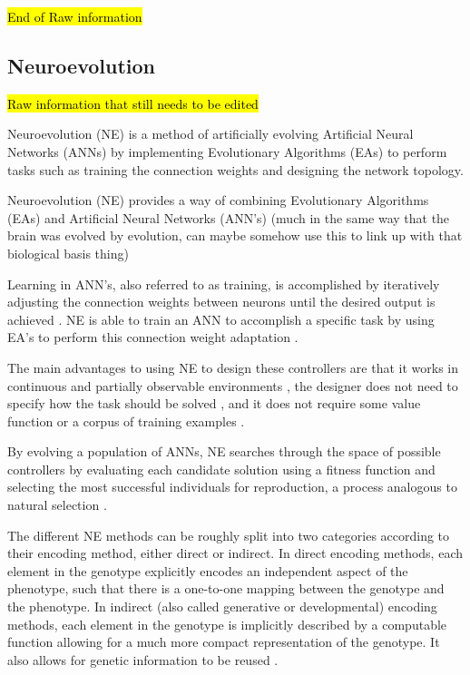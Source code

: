 \documentclass[conference]{IEEEtran}
\begin{document}
\hl{End of Raw information}

\subsection{Neuroevolution}

\hl{Raw information that still needs to be edited}

Neuroevolution (NE) is a method of artificially evolving Artificial Neural Networks (ANNs) by implementing Evolutionary Algorithms (EAs) to perform tasks such as training the connection weights and designing the network topology\cite{RefWorks:31,RefWorks:1}. 

Neuroevolution (NE) provides a way of combining Evolutionary Algorithms (EAs) and Artificial Neural Networks (ANN's)  (much in the same way that the brain was evolved by evolution, can maybe somehow use this to link up with that biological basis thing)

Learning in ANN's, also referred to as training, is accomplished by iteratively adjusting the connection weights between neurons until the desired output is achieved \cite{dayhoff2001artificial}. NE is able to train an ANN to accomplish a specific task by using EA's to perform this connection weight adaptation \cite{Miikkulainen2010}.

The main advantages to using NE to design these controllers are that it works in continuous and partially observable environments \cite{Miikkulainen:2010:ENN:1830761.1830902}, the designer does not need to specify how the task should be solved \cite{RefWorks:32}, and it does not require some value function or a corpus of training examples \cite{GomezSchmidhuberMiikkulainen2006}.

By evolving a population of ANNs, NE searches through the space of possible controllers by evaluating each candidate solution using a fitness function and selecting the most successful individuals for reproduction, a process analogous to natural selection \cite{RefWorks:32,gomez2001neuro}. 

The different NE methods can be roughly split into two categories according to their encoding method, either direct or indirect. In direct encoding methods, each element in the genotype explicitly encodes an independent aspect of the phenotype, such that there is a one-to-one mapping between the genotype and the phenotype. In indirect (also called generative or developmental) encoding methods, each element in the genotype is implicitly described by a computable function allowing for a much more compact representation of the genotype. It also allows for genetic information to be reused \cite{clune2011performance,Stanley2003}.
\end{document}
